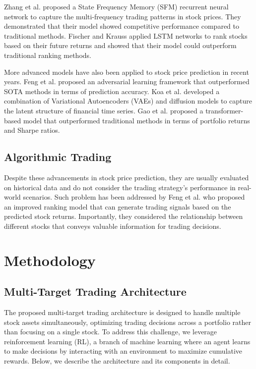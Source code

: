 \documentclass[conference]{IEEEtran}
\begin{document}
Zhang et al. \cite{zhang2017} proposed a State Frequency Memory (SFM)
recurrent neural network to capture the multi-frequency trading
patterns in stock prices. They demonstrated that their model showed
competitive performance compared to traditional methods. Fischer and
Krauss \cite{fischer2018} applied LSTM networks to rank stocks based
on their future returns and showed that their model could outperform
traditional ranking methods.

More advanced models have also been applied to stock price prediction
in recent years. Feng et al. \cite{feng2019an} proposed an
adversarial learning framework that outperformed SOTA methods in
terms of prediction accuracy. Koa et al. \cite{koa2023} developed a
combination of Variational Autoencoders (VAEs) and diffusion models
to capture the latent structure of financial time series. Gao et al.
\cite{gao2023} proposed a transformer-based model that outperformed
traditional methods in terms of portfolio returns and Sharpe ratios.

\subsection{Algorithmic Trading}

Despite these advancements in stock price prediction, they are
usually evaluated on historical data and do not consider the trading
strategy's performance in real-world scenarios. Such problem has been
addressed by Feng et al. \cite{feng2019rank} who proposed an improved
ranking model that can generate trading signals based on the
predicted stock returns. Importantly, they considered the
relationship between different stocks that conveys valuable
information for trading decisions.


\section{Methodology}

\subsection{Multi-Target Trading Architecture}


The proposed multi-target trading architecture is designed to handle multiple stock assets simultaneously, optimizing trading decisions across a portfolio rather than focusing on a single stock. To address this challenge, we leverage reinforcement learning (RL), a branch of machine learning where an agent learns to make decisions by interacting with an environment to maximize cumulative rewards. Below, we describe the architecture and its components in detail.
\end{document}
